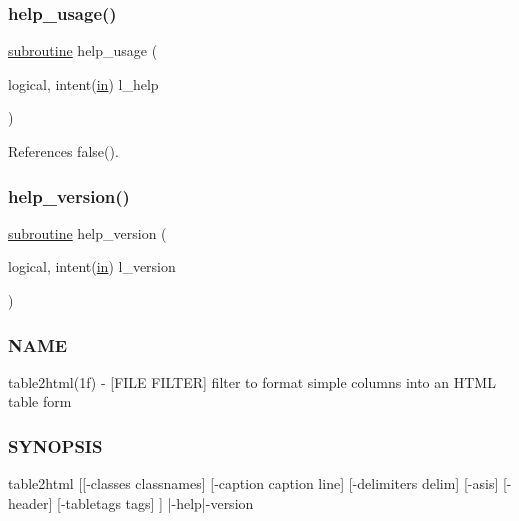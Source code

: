 \subsubsection{\texorpdfstring{help\+\_\+usage()}{help\_usage()}}
{\footnotesize\ttfamily \hyperlink{M__stopwatch_83_8txt_acfbcff50169d691ff02d4a123ed70482}{subroutine} help\+\_\+usage (\begin{DoxyParamCaption}\item[{logical, intent(\hyperlink{M__journal_83_8txt_afce72651d1eed785a2132bee863b2f38}{in})}]{l\+\_\+help }\end{DoxyParamCaption})}



References false().

\mbox{\label{table2html_8f90_a39c21619b08a3c22f19e2306efd7f766}} 
\subsubsection{\texorpdfstring{help\+\_\+version()}{help\_version()}}
{\footnotesize\ttfamily \hyperlink{M__stopwatch_83_8txt_acfbcff50169d691ff02d4a123ed70482}{subroutine} help\+\_\+version (\begin{DoxyParamCaption}\item[{logical, intent(\hyperlink{M__journal_83_8txt_afce72651d1eed785a2132bee863b2f38}{in})}]{l\+\_\+version }\end{DoxyParamCaption})}



\subsubsection*{N\+A\+ME}

table2html(1f) -\/ \mbox{[}F\+I\+LE F\+I\+L\+T\+ER\mbox{]} filter to format simple columns into an H\+T\+ML table form 

\subsubsection*{S\+Y\+N\+O\+P\+S\+IS}

\begin{DoxyVerb}table2html [[-classes classnames] [-caption caption line] [-delimiters delim]
           [-asis] [-header] [-tabletags tags] ] |-help|-version
\end{DoxyVerb}


